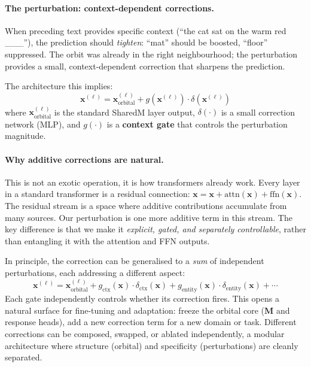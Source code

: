 \documentclass[11pt, a4paper]{article}
\newcommand{\M}{\mathbf{M}}
\newcommand{\x}{\mathbf{x}}
\theoremstyle{remark}
\begin{document}
\paragraph{The perturbation: context-dependent corrections.}
When preceding text provides specific context (``the cat sat on the warm red \_\_\_''), the prediction should \emph{tighten}: ``mat'' should be boosted, ``floor'' suppressed.
The orbit was already in the right neighbourhood; the perturbation provides a small, context-dependent correction that sharpens the prediction.

The architecture this implies:
\begin{equation}
    \x^{(\ell)} = \x^{(\ell)}_{\text{orbital}} + g(\x^{(\ell)}) \cdot \delta(\x^{(\ell)})
\end{equation}
where $\x^{(\ell)}_{\text{orbital}}$ is the standard SharedM layer output, $\delta(\cdot)$ is a small correction network (MLP), and $g(\cdot)$ is a \textbf{context gate} that controls the perturbation magnitude.

\paragraph{Why additive corrections are natural.}
This is not an exotic operation, it is how transformers already work.
Every layer in a standard transformer is a residual connection: $\x = \x + \text{attn}(\x) + \text{ffn}(\x)$.
The residual stream is a space where additive contributions accumulate from many sources.
Our perturbation is one more additive term in this stream.
The key difference is that we make it \emph{explicit, gated, and separately controllable}, rather than entangling it with the attention and FFN outputs.

In principle, the correction can be generalised to a \emph{sum} of independent perturbations, each addressing a different aspect:
\begin{equation}
    \x^{(\ell)} = \x^{(\ell)}_{\text{orbital}}
        + g_{\text{ctx}}(\x) \cdot \delta_{\text{ctx}}(\x)
        + g_{\text{entity}}(\x) \cdot \delta_{\text{entity}}(\x)
        + \cdots
\end{equation}
Each gate independently controls whether its correction fires.
This opens a natural surface for fine-tuning and adaptation: freeze the orbital core ($\M$ and response heads), add a new correction term for a new domain or task.
Different corrections can be composed, swapped, or ablated independently, a modular architecture where structure (orbital) and specificity (perturbations) are cleanly separated.
\end{document}
